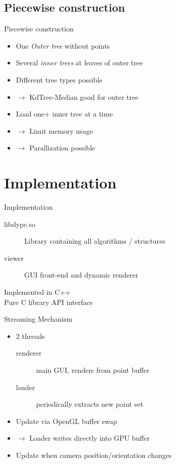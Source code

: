 \documentclass{beamer}
\begin{document}
\subsection{Piecewise construction}

\begin{frame}{Piecewise construction}
	\begin{itemize}
	\item One \emph{Outer tree} without points
	\item Several \emph{inner trees} at leaves of outer tree
	\item Different tree types possible
	\item $\rightarrow$ KdTree-Median good for outer tree
	\item Load one+ inner tree at a time
	\item $\rightarrow$ Limit memory usage
	\item $\rightarrow$ Parallization possible
	\end{itemize}
\end{frame}

\section{Implementation}

\begin{frame}{Implementation}
	\begin{description}
	\item[libdypc.so] Library containing all algorithms / structures
	\item[viewer] GUI front-end and dynamic renderer
	\end{description}
	Implemented in C++ \\
	Pure C library API interface
\end{frame}

\begin{frame}{Streaming Mechanism}
	\begin{itemize}
	\item 2 threads
		\begin{description}
		\item[renderer] main GUI, renders from point buffer
		\item[loader] periodically extracts new point set
		\end{description}
	\item Update via OpenGL buffer swap
	\item $\rightarrow$ Loader writes directly into GPU buffer
	\item Update when camera position/orientation changes
	\end{itemize}
\end{frame}
\end{document}
